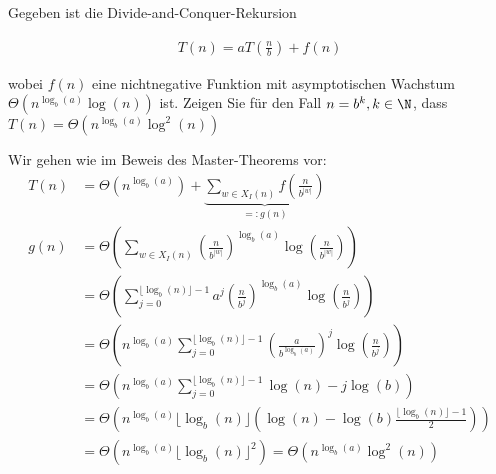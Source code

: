 
\begin{exercise}

Gegeben ist die Divide-and-Conquer-Rekursion

\begin{align*}
  T(n) = aT\left(\frac{n}{b}\right) + f(n)
\end{align*}

wobei $f(n)$ eine nichtnegative Funktion mit asymptotischen Wachstum $\Theta(n^{\log_b(a)}\log (n))$ ist. Zeigen Sie für den Fall $n = b^k, k \in \N$, dass $T(n) = \Theta(n^{\log_b(a)}\log^2 (n))$

\end{exercise}


\begin{solution}
Wir gehen wie im Beweis des Master-Theorems vor:
\begin{align*}
  T(n) &= \Theta\left(n^{\log_b(a)}\right) +
  \underbrace{\sum_{w \in X_I(n)}f\left(\frac{n}{b^{|w|}}\right)}_{=: g(n)} \\
  g(n) &= \Theta\left(\sum_{w \in X_I(n)}
  \left(\frac{n}{b^{|w|}}\right)^{\log_b(a)}\log \left(\frac{n}{b^{|w|}}\right)\right) \\
  &= \Theta\left(\sum_{j = 0}^{\lfloor \log_b(n) \rfloor -1}a^{j}
  \left(\frac{n}{b^{j}}\right)^{\log_b(a)}\log \left(\frac{n}{b^{j}}\right)\right) \\
  &= \Theta\left(n^{\log_b(a)}\sum_{j = 0}^{\lfloor \log_b(n) \rfloor -1}
  \left(\frac{a}{b^{\log_b(a)}}\right)^j \log \left(\frac{n}{b^{j}}\right)\right) \\
  &= \Theta\left(n^{\log_b(a)}\sum_{j = 0}^{\lfloor \log_b(n) \rfloor -1}
  \log(n) - j\log(b)\right) \\
  &= \Theta\left(n^{\log_b(a)}\lfloor \log_b(n) \rfloor\left(\log(n) -
  \log(b)\frac{\lfloor \log_b(n) \rfloor -1}{2}\right)\right) \\
  &= \Theta\left(n^{\log_b(a)}\lfloor \log_b(n) \rfloor^2\right)
  =  \Theta\left(n^{\log_b(a)}\log^2(n)\right)
\end{align*}
\end{solution}


